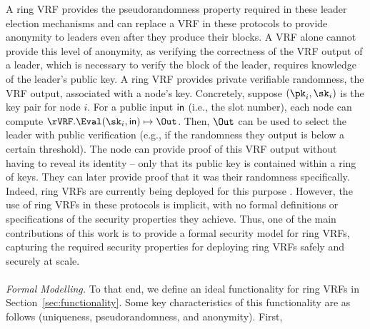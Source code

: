 A ring VRF provides the pseudorandomness property required in these leader election mechanisms and can replace a VRF in these protocols to provide anonymity to leaders even after they produce their blocks.
A VRF alone cannot provide this level of anonymity, as verifying the correctness of the VRF output  of a leader, which is necessary to verify the block of the leader, requires knowledge of the leader's public key.
A ring VRF provides private verifiable
randomness, the VRF output, associated with a node's key.
Concretely, suppose $(\pk_i, \sk_i)$ is the key pair for node $i$.
For a public input $\mathsf{in}$ (i.e., the slot number),
each node can compute $\rVRF.\Eval(\sk_i,\msg) \mapsto \Out$. Then,
$\Out$ can be used to select the leader with public verification (e.g., if the randomness they output is below a certain threshold).
The node can provide proof of
this VRF output without having to reveal its identity -- only that its public key is contained within a ring of keys.
They can later provide proof that it was their randomness specifically.
Indeed, ring VRFs are currently being deployed for this purpose \cite{Semaphore,BurdgesASV23a}.
However, the use of ring VRFs in these protocols is implicit, with no formal definitions or specifications of the security properties they achieve. 
Thus, one of the main contributions of this work is to provide a formal security model for ring VRFs, capturing the required security properties for deploying ring VRFs safely and securely at scale.
\\\\
\noindent \emph{Formal Modelling.} To that end,
we define an ideal functionality for ring VRFs in Section~\ref{sec:functionality}. Some key characteristics of this functionality are as follows (uniqueness, pseudorandomness, and anonymity). First, 
\\\\
